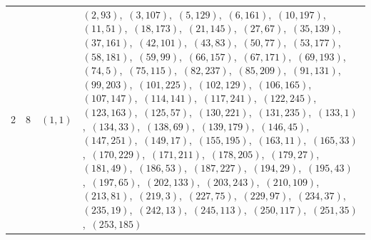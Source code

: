 \documentclass[11pt]{article}
\begin{document}
\begin{longtable}{@{}rrl>{\raggedright\arraybackslash}p{}@{}}
2 & 8 & $(1,1)$ & $(2,93)$,\allowbreak\ $(3,107)$,\allowbreak\ $(5,129)$,\allowbreak\ $(6,161)$,\allowbreak\ $(10,197)$,\allowbreak\ $(11,51)$,\allowbreak\ $(18,173)$,\allowbreak\ $(21,145)$,\allowbreak\ $(27,67)$,\allowbreak\ $(35,139)$,\allowbreak\ $(37,161)$,\allowbreak\ $(42,101)$,\allowbreak\ $(43,83)$,\allowbreak\ $(50,77)$,\allowbreak\ $(53,177)$,\allowbreak\ $(58,181)$,\allowbreak\ $(59,99)$,\allowbreak\ $(66,157)$,\allowbreak\ $(67,171)$,\allowbreak\ $(69,193)$,\allowbreak\ $(74,5)$,\allowbreak\ $(75,115)$,\allowbreak\ $(82,237)$,\allowbreak\ $(85,209)$,\allowbreak\ $(91,131)$,\allowbreak\ $(99,203)$,\allowbreak\ $(101,225)$,\allowbreak\ $(102,129)$,\allowbreak\ $(106,165)$,\allowbreak\ $(107,147)$,\allowbreak\ $(114,141)$,\allowbreak\ $(117,241)$,\allowbreak\ $(122,245)$,\allowbreak\ $(123,163)$,\allowbreak\ $(125,57)$,\allowbreak\ $(130,221)$,\allowbreak\ $(131,235)$,\allowbreak\ $(133,1)$,\allowbreak\ $(134,33)$,\allowbreak\ $(138,69)$,\allowbreak\ $(139,179)$,\allowbreak\ $(146,45)$,\allowbreak\ $(147,251)$,\allowbreak\ $(149,17)$,\allowbreak\ $(155,195)$,\allowbreak\ $(163,11)$,\allowbreak\ $(165,33)$,\allowbreak\ $(170,229)$,\allowbreak\ $(171,211)$,\allowbreak\ $(178,205)$,\allowbreak\ $(179,27)$,\allowbreak\ $(181,49)$,\allowbreak\ $(186,53)$,\allowbreak\ $(187,227)$,\allowbreak\ $(194,29)$,\allowbreak\ $(195,43)$,\allowbreak\ $(197,65)$,\allowbreak\ $(202,133)$,\allowbreak\ $(203,243)$,\allowbreak\ $(210,109)$,\allowbreak\ $(213,81)$,\allowbreak\ $(219,3)$,\allowbreak\ $(227,75)$,\allowbreak\ $(229,97)$,\allowbreak\ $(234,37)$,\allowbreak\ $(235,19)$,\allowbreak\ $(242,13)$,\allowbreak\ $(245,113)$,\allowbreak\ $(250,117)$,\allowbreak\ $(251,35)$,\allowbreak\ $(253,185)$\\

\end{longtable}
\end{document}
